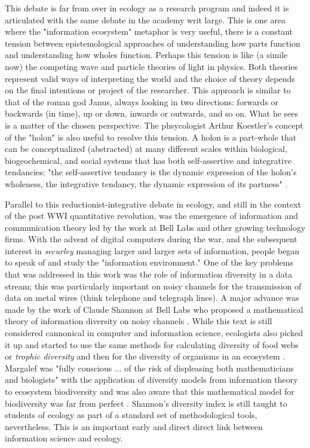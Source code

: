 This debate is far from over in ecology as a research program and indeed it is articulated with the same debate in the academy writ large. This is one area where the "information ecosystem" metaphor is very useful, there is a constant tension between epistemological approaches of understanding how  parts function and understanding how wholes function. Perhaps this tension is like (a simile now) the competing wave and particle theories of light in physics. Both theories represent valid ways of interpreting the world and the choice of theory depends on the final intentions or project of the researcher. This approach is similar to that of the roman god Janus, always looking in two directions: forwards or backwards (in time), up or down, inwards or outwards, and so on. What he sees is a matter of the chosen perspective. The phsycologist Arthur Koestler's concept of the "holon" is also useful to resolve this tension. A holon is a part-whole that can be conceptualized (abstracted) at many different scales within biological, biogeochemical, and social systems that has both self-assertive and integrative tendancies: "the self-assertive tendancy is the dynamic expression of the holon's wholeness, the integrative tendancy, the dynamic expression of its partness" \cite[][p. 56] {koestler_1967}.

Parallel to this reductionist-integrative debate in ecology, and still in the context of the post WWI quantitative revolution, was the emergence of information and communication theory led by the work at Bell Labs and other growing technology firms. With the advent of digital computers during the war, and the subsequent interest in \textit{securley} managing larger and larger sets of information, people began to speak of and study the "information environment." One of the key problems that was addressed in this work was the role of information diversity in a data stream; this was particularly important on noisy channels for the transmission of data on metal wires (think telephone and telegraph lines). A major advance was made by the work of Claude Shannon at Bell Labs who proposed a mathematical theory of information diversity on noisy channels \cite{shannon_1948}. While this text is still considered cannonical in computer and information science, ecologists also picked it up and started to use the same methods for calculating diversity of food webs or \textit{trophic diversity} \cite{macarthur_1955} and then for the diversity of organisms in an ecosystem \cite{margalef_1957}. Margalef was "fully conscious ... of the risk of displeasing both mathematicians and biologists" with the application of diversity models from information theory to ecosystem biodiversity and was also aware that this mathematical model for biodiversity was far from perfect \cite{margalef_1957}. Shannon's diversity index is still taught to students of ecology as part of a standard set of methodological tools, nevertheless. This is an important early and direct direct link between information science and ecology.

